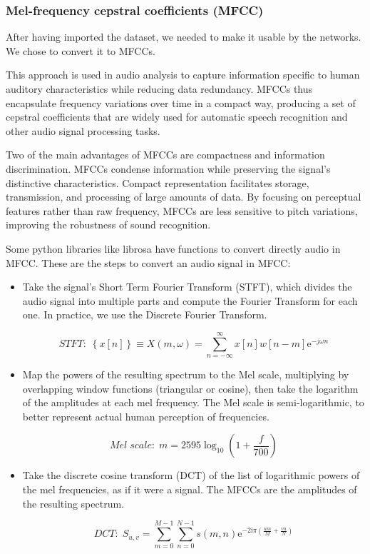 \documentclass[11pt]{article}
\begin{document}
\subsubsection{Mel-frequency cepstral coefficients (MFCC)}

After having imported the dataset, we needed to make it usable by the networks. We chose to convert it to MFCCs.

This approach is used in audio analysis to capture information specific to human auditory characteristics while reducing data redundancy. MFCCs thus encapsulate frequency variations over time in a compact way, producing a set of cepstral coefficients that are widely used for automatic speech recognition and other audio signal processing tasks.

Two of the main advantages of MFCCs are compactness and information discrimination. MFCCs condense information while preserving the signal's distinctive characteristics. Compact representation facilitates storage, transmission, and processing of large amounts of data.
By focusing on perceptual features rather than raw frequency, MFCCs are less sensitive to pitch variations, improving the robustness of sound recognition.

Some python libraries like librosa have functions to convert directly audio in MFCC. These are the steps to convert an audio signal in MFCC:

\begin{itemize}
  \item Take the signal's Short Term Fourier Transform (STFT), which divides the audio signal into multiple parts and compute the Fourier Transform for each one. In practice, we use the Discrete Fourier Transform.

  \begin{equation}
  STFT: \;\left\{ x[ n ] \right\} \equiv X(m,\omega) = \sum_{n=-\infty}^{\infty} x[n]w[n-m]\mathrm{e}^{-j \omega n}
\end{equation}

  \item Map the powers of the resulting spectrum to the Mel scale, multiplying by overlapping window functions (triangular or cosine), then take the logarithm of the amplitudes at each mel frequency. The Mel scale is semi-logarithmic, to better represent actual human perception of frequencies.
  
  \begin{equation}
     Mel \; scale: \; m = 2595 \log_{10}\left(1 + \frac{f}{700}\right)
\end{equation}
  
  \item Take the discrete cosine transform (DCT) of the list of logarithmic powers of the mel frequencies, as if it were a signal. The MFCCs are the amplitudes of the resulting spectrum.
  
  \begin{equation}
     DCT: \; S_{u,v} = \sum_{m = 0}^{M- 1} \sum_{n = 0}^{N- 1} s(m, n)\mathrm e^{-2\mathrm i\pi \left ( \frac{um}M+ \frac{vn}N\right )}
\end{equation}
\end{itemize}
\end{document}
